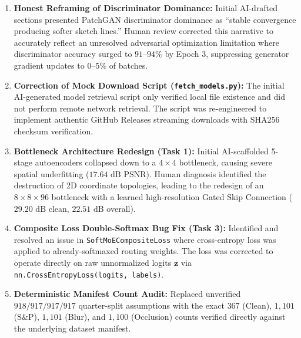 \documentclass[conference]{IEEEtran}
\begin{document}
\begin{enumerate}
    \begin{itemize}
        \item \textit{Missing Type Annotations:} Omitted \texttt{typing} imports (\texttt{List, Dict, Any}) broke headless Colab execution.
        \item \textit{Container Import Bloat:} Top-level PyTorch imports in \texttt{models/\_\_init\_\_.py} caused Docker backend build crashes in torchless environments. Resolved via PEP 562 lazy dynamic imports.
    \end{itemize}
    \item \textbf{Honest Reframing of Discriminator Dominance:} Initial AI-drafted sections presented PatchGAN discriminator dominance as ``stable convergence producing softer sketch lines.'' Human review corrected this narrative to accurately reflect an unresolved adversarial optimization limitation where discriminator accuracy surged to $91$--$94\%$ by Epoch 3, suppressing generator gradient updates to $0$--$5\%$ of batches.
    \item \textbf{Correction of Mock Download Script (\texttt{fetch\_models.py}):} The initial AI-generated model retrieval script only verified local file existence and did not perform remote network retrieval. The script was re-engineered to implement authentic GitHub Releases streaming downloads with SHA256 checksum verification.
    \item \textbf{Bottleneck Architecture Redesign (Task 1):} Initial AI-scaffolded 5-stage autoencoders collapsed down to a $4 \times 4$ bottleneck, causing severe spatial underfitting ($17.64\text{ dB}$ PSNR). Human diagnosis identified the destruction of 2D coordinate topologies, leading to the redesign of an $8 \times 8 \times 96$ bottleneck with a learned high-resolution Gated Skip Connection ($29.20\text{ dB}$ clean, $22.51\text{ dB}$ overall).
    \item \textbf{Composite Loss Double-Softmax Bug Fix (Task 3):} Identified and resolved an issue in \texttt{SoftMoECompositeLoss} where cross-entropy loss was applied to already-softmaxed routing weights. The loss was corrected to operate directly on raw unnormalized logits $\mathbf{z}$ via \texttt{nn.CrossEntropyLoss(logits, labels)}.
    \item \textbf{Deterministic Manifest Count Audit:} Replaced unverified $918 / 917 / 917 / 917$ quarter-split assumptions with the exact $367$ (Clean), $1,101$ (S\&P), $1,101$ (Blur), and $1,100$ (Occlusion) counts verified directly against the underlying dataset manifest.
\end{enumerate}
\end{document}
